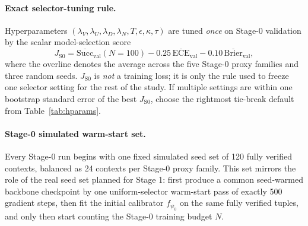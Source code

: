 \documentclass[10pt]{article}
\theoremstyle{plain}
\theoremstyle{definition}
\theoremstyle{remark}
\begin{document}
\paragraph{Exact selector-tuning rule.}
Hyperparameters $(\lambda_V,\lambda_U,\lambda_D,\lambda_N,T,\epsilon,\kappa,\tau)$ are tuned \emph{once} on Stage-0 validation by the scalar model-selection score
\[
J_{\mathrm{S0}}
=
\overline{\mathrm{Succ}}_{\mathrm{val}}(N=100)
-0.25\,\overline{\mathrm{ECE}}_{\mathrm{val}}
-0.10\,\overline{\mathrm{Brier}}_{\mathrm{val}},
\]
where the overline denotes the average across the five Stage-0 proxy families and three random seeds. $J_{\mathrm{S0}}$ is \emph{not} a training loss; it is only the rule used to freeze one selector setting for the rest of the study. If multiple settings are within one bootstrap standard error of the best $J_{\mathrm{S0}}$, choose the rightmost tie-break default from Table~\ref{tab:hparams}.

\paragraph{Stage-0 simulated warm-start set.}
Every Stage-0 run begins with one fixed simulated seed set of 120 fully verified contexts, balanced as 24 contexts per Stage-0 proxy family. This set mirrors the role of the real seed set planned for Stage 1: first produce a common seed-warmed backbone checkpoint by one uniform-selector warm-start pass of exactly 500 gradient steps, then fit the initial calibrator $f_{\psi_0}$ on the same fully verified tuples, and only then start counting the Stage-0 training budget $N$.
\end{document}
